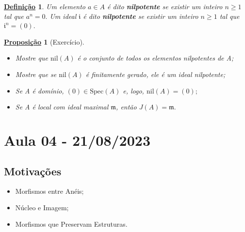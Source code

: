 \documentclass{article}
\newtheorem*{def*}{\underline{Defini\c c\~ao}}
\newtheorem*{prop*}{\underline{Proposi\c c\~ao}}
\begin{document}
\begin{def*}
  Um elemento \(a\in A\) é dito \textbf{nilpotente} se existir um inteiro \(n\geq 1\) tal que \(a^{n} = 0.\) Um ideal
  \(\mathfrak{i}\) é dito \textbf{nilpotente} se existir um inteiro \(n\geq 1\) tal que \(\mathfrak{i}^{n} = (0).\)
\end{def*}
\begin{prop*}[Exercício]
  \begin{itemize}
    \item[1)] Mostre que \(\mathrm{nil}(A)\) é o conjunto de todos os elementos nilpotentes de A;
    \item[2)] Mostre que se \(\mathrm{nil}(A)\) é finitamente gerado, ele é um ideal nilpotente;
    \item[3)] Se A é domínio, \((0)\in \mathrm{Spec}(A)\) e, logo, \(\mathrm{nil}(A) = (0);\)
    \item[4)] Se A é local com ideal maximal \(\mathfrak{m}\), então \(J(A) = \mathfrak{m}.\)
  \end{itemize}  
\end{prop*}
\newpage

\section{Aula 04 - 21/08/2023}
\subsection{Motivações}
\begin{itemize}
  \item Morfismos entre Anéis;
  \item Núcleo e Imagem;
  \item Morfismos que Preservam Estruturas.
\end{itemize}
\end{document}
